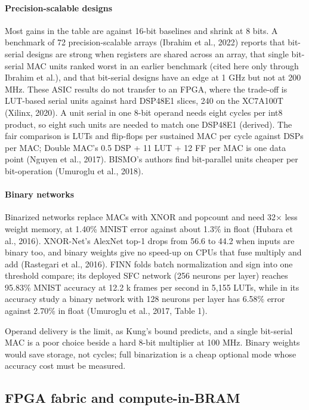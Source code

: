 \paragraph{Precision-scalable designs} Most gains in the table are against 16-bit baselines and shrink at 8 bits. A benchmark of 72 precision-scalable arrays (Ibrahim et al., 2022) reports that bit-serial designs are strong when registers are shared across an array, that single bit-serial MAC units ranked worst in an earlier benchmark (cited here only through Ibrahim et al.), and that bit-serial designs have an edge at 1 GHz but not at 200 MHz. These ASIC results do not transfer to an FPGA, where the trade-off is LUT-based serial units against hard DSP48E1 slices, 240 on the XC7A100T (Xilinx, 2020). A unit serial in one 8-bit operand needs eight cycles per int8 product, so eight such units are needed to match one DSP48E1 (derived). The fair comparison is LUTs and flip-flops per sustained MAC per cycle against DSPs per MAC; Double MAC's 0.5 DSP + 11 LUT + 12 FF per MAC is one data point (Nguyen et al., 2017). BISMO's authors find bit-parallel units cheaper per bit-operation (Umuroglu et al., 2018).

\paragraph{Binary networks} Binarized networks replace MACs with XNOR and popcount and need 32× less weight memory, at 1.40\% MNIST error against about 1.3\% in float (Hubara et al., 2016). XNOR-Net's AlexNet top-1 drops from 56.6 to 44.2 when inputs are binary too, and binary weights give no speed-up on CPUs that fuse multiply and add (Rastegari et al., 2016). FINN folds batch normalization and sign into one threshold compare; its deployed SFC network (256 neurons per layer) reaches 95.83\% MNIST accuracy at 12.2 k frames per second in 5,155 LUTs, while in its accuracy study a binary network with 128 neurons per layer has 6.58\% error against 2.70\% in float (Umuroglu et al., 2017, Table 1).

\begin{forls}[For LS]
Operand delivery is the limit, as Kung's bound predicts, and a single bit-serial MAC is a poor choice beside a hard 8-bit multiplier at 100 MHz. Binary weights would save storage, not cycles; full binarization is a cheap optional mode whose accuracy cost must be measured.

\end{forls}
\subsection{FPGA fabric and compute-in-BRAM}


